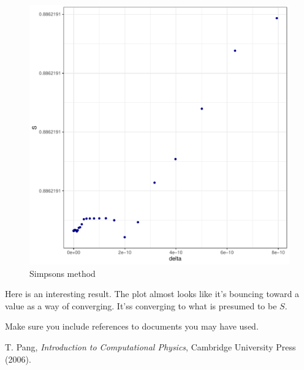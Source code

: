 \documentclass[prb,twocolumn]{revtex4-2}
\begin{document}
\begin{figure}[h!]
\centerline{\includegraphics [width=3 in] {simpsons_adapt}} \caption{Simpsons method} \label{simpsons_adapt}
\end{figure}

Here is an interesting result. The plot almost looks like it's bouncing toward a value as a way of converging. It'ss converging to what is presumed to be $S$.

Make sure you include references to documents \cite{thecoursetext} you may have used.

\begin{thebibliography}{99}

 T. Pang, \emph{Introduction to Computational Physics}, Cambridge University Press (2006).

\end{thebibliography}
\end{document}
